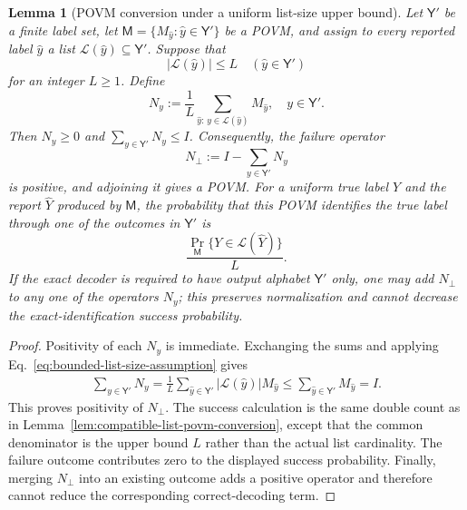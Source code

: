 \documentclass[11pt]{article}
\newcommand{\1}{\mathbf 1}
\theoremstyle{plain}
\newtheorem{lemma}[theorem]{Lemma}
\theoremstyle{definition}
\theoremstyle{remark}
\begin{document}
\begin{lemma}[POVM conversion under a uniform list-size upper bound]
\label{lem:bounded-list-povm-conversion}
Let $\mathsf Y'$ be a finite label set, let
$\mathsf M=\{M_{\widehat y}:\widehat y\in\mathsf Y'\}$ be a POVM, and assign
to every reported label $\widehat y$ a list
$\mathcal L(\widehat y)\subseteq\mathsf Y'$.  Suppose that
\begin{equation}
 |\mathcal L(\widehat y)|\le L
 \quad(\widehat y\in\mathsf Y')
 \label{eq:bounded-list-size-assumption}
\end{equation}
for an integer $L\ge1$.  Define
\begin{equation}
 N_y:=\frac1L
 \sum_{\widehat y:\,y\in\mathcal L(\widehat y)}M_{\widehat y},
 \quad y\in\mathsf Y'.
 \label{eq:bounded-list-subpovm}
\end{equation}
Then $N_y\ge0$ and $\sum_{y\in\mathsf Y'}N_y\le I$.  Consequently, the
failure operator
\begin{equation}
 N_\bot:=I-\sum_{y\in\mathsf Y'}N_y
 \label{eq:bounded-list-failure-operator}
\end{equation}
is positive, and adjoining it gives a POVM.  For a uniform true label $Y$
and the report $\widehat Y$ produced by $\mathsf M$, the probability that
this POVM identifies the true label through one of the outcomes in
$\mathsf Y'$ is
\begin{equation}
 \frac{\Pr_{\mathsf M}\{Y\in\mathcal L(\widehat Y)\}}{L}.
 \label{eq:bounded-list-converted-success}
\end{equation}
If the exact decoder is required to have output alphabet $\mathsf Y'$ only,
one may add $N_\bot$ to any one of the operators $N_y$; this preserves
normalization and cannot decrease the exact-identification success
probability.
\end{lemma}

\begin{proof}
Positivity of each $N_y$ is immediate.  Exchanging the sums and applying
Eq.~\eqref{eq:bounded-list-size-assumption} gives
\begin{align}
 \sum_{y\in\mathsf Y'}N_y
 =\frac1L\sum_{\widehat y\in\mathsf Y'}
 |\mathcal L(\widehat y)|M_{\widehat y}
 \le\sum_{\widehat y\in\mathsf Y'}M_{\widehat y}=I.
 \label{eq:bounded-list-subnormalization}
\end{align}
This proves positivity of $N_\bot$.  The success calculation is the same
double count as in Lemma~\ref{lem:compatible-list-povm-conversion}, except
that the common denominator is the upper bound $L$ rather than the actual
list cardinality.  The failure outcome contributes zero to the displayed
success probability.  Finally, merging $N_\bot$ into an existing outcome
adds a positive operator and therefore cannot reduce the corresponding
correct-decoding term.
\end{proof}
\end{document}
